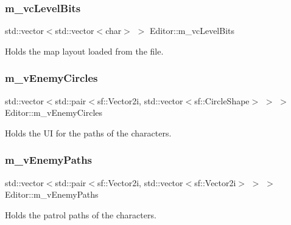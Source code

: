 \subsubsection{\texorpdfstring{m\+\_\+vc\+Level\+Bits}{m\_vcLevelBits}}
{\footnotesize\ttfamily std\+::vector$<$std\+::vector$<$char$>$ $>$ Editor\+::m\+\_\+vc\+Level\+Bits\hspace{0.3cm}{\ttfamily [private]}}



Holds the map layout loaded from the file. 

\mbox{\label{class_editor_a27b37d416a567bdd076af498e78031dd}} 
\subsubsection{\texorpdfstring{m\+\_\+v\+Enemy\+Circles}{m\_vEnemyCircles}}
{\footnotesize\ttfamily std\+::vector$<$std\+::pair$<$sf\+::\+Vector2i, std\+::vector$<$sf\+::\+Circle\+Shape$>$ $>$ $>$ Editor\+::m\+\_\+v\+Enemy\+Circles\hspace{0.3cm}{\ttfamily [private]}}



Holds the UI for the paths of the characters. 

\mbox{\label{class_editor_a8f0798b89dd3ec768408e5b5eddc4ec5}} 
\subsubsection{\texorpdfstring{m\+\_\+v\+Enemy\+Paths}{m\_vEnemyPaths}}
{\footnotesize\ttfamily std\+::vector$<$std\+::pair$<$sf\+::\+Vector2i, std\+::vector$<$sf\+::\+Vector2i$>$ $>$ $>$ Editor\+::m\+\_\+v\+Enemy\+Paths\hspace{0.3cm}{\ttfamily [private]}}



Holds the patrol paths of the characters. 

\mbox{\label{class_editor_a948e20d3f6fb1c3036087e88dddaf69a}} 
